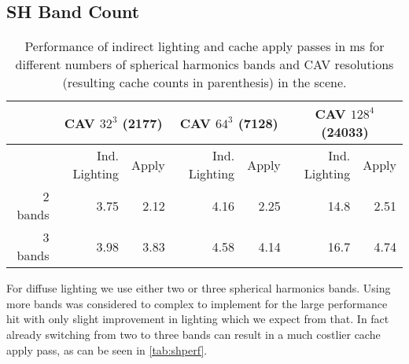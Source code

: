 \documentclass[thesis.tex]{subfiles}
\begin{document}
\subsection{SH Band Count}
\begin{table}[htbp]
  \centering
    \begin{tabular}{r|rr|rr|rr}
    \toprule
          & \multicolumn{2}{c|}{CAV $32^3$ (2177)} & \multicolumn{2}{c|}{CAV $64^3$ (7128)} & \multicolumn{2}{c}{CAV $128^4$ (24033)} \\
    \midrule
          & \small{Ind. Lighting} & Apply & Ind. Lighting & Apply & Ind. Lighting & Apply \\
    \midrule
    2 bands & 3.75  & 2.12  & 4.16  & 2.25  & 14.8  & 2.51 \\
    3 bands & 3.98  & 3.83  & 4.58  & 4.14  & 16.7  & 4.74 \\
    \bottomrule
    \end{tabular}
\caption{Performance of indirect lighting and cache apply passes in ms for different numbers of spherical harmonics bands and CAV resolutions (resulting cache counts in parenthesis) in the  scene. }
\label{tab:shperf}
\end{table}
For diffuse lighting we use either two or three spherical harmonics bands.
Using more bands was considered to complex to implement for the large performance hit with only slight improvement in lighting which we expect from that.
In fact already switching from two to three bands can result in a much costlier cache apply pass, as can be seen in \autoref{tab:shperf}.
\end{document}
